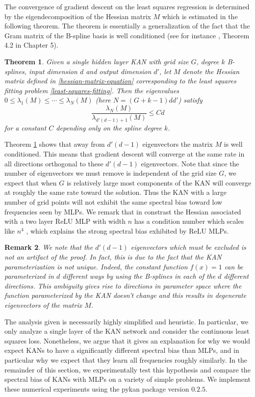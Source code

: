 \documentclass[12pt]{caltech_thesis}
\newtheorem{theorem}{Theorem}[section]
\newtheorem{remark}[theorem]{Remark}
\numberwithin{equation}{section}
\begin{document}
The convergence of gradient descent on the least squares regression is determined by the eigendecomposition of the Hessian matrix $M$ which is estimated in the following theorem. {The theorem is essentially a generalization of the fact that the Gram matrix of the B-spline basis is well conditioned (see for instance \cite{devore1993constructive}, Theorem 4.2 in Chapter 5).}
\begin{theorem}\label{hessian-eigenvalue-bound-theorem}
    Given a single hidden layer KAN with grid size $G$, degree $k$ B-splines, input dimension $d$ and output dimension $d'$, let $M$ denote the Hessian matrix defined in \eqref{hessian-matrix-equation} corresponding to the least squares fitting problem \eqref{least-squares-fitting}. Then the eigenvalues $0\leq \lambda_1(M) \leq \cdots \leq \lambda_{N}(M)$ (here $N = (G+k-1)dd'$) satisfy
    \begin{equation}
        \frac{\lambda_{N}(M)}{\lambda_{d'(d-1) + 1}(M)} \leq Cd
    \end{equation}
    for a constant $C$ depending only on the spline degree $k$.
\end{theorem}
Theorem \ref{hessian-eigenvalue-bound-theorem} shows that away from $d'(d-1)$ eigenvectors the matrix $M$ is well conditioned. This means that gradient descent will converge at the same rate in all directions orthogonal to these $d'(d-1)$ eigenvectors. Note that since the number of eigenvectors we must remove is independent of the grid size $G$, we expect that when $G$ is relatively large most components of the KAN will converge at roughly the same rate toward the solution. Thus the KAN with a large number of grid points will not exhibit the same spectral bias toward low frequencies seen by MLPs. {We remark that in constrast the Hessian associated with a two layer ReLU MLP with width $n$ has a condition number which scales like $n^4$ \cite{hong2022activation}, which explains the strong spectral bias exhibited by ReLU MLPs.}
\begin{remark}
    We note that the $d'(d-1)$ eigenvectors which must be excluded is not an artifact of the proof. In fact, this is due to the fact that the KAN parameterization is not unique. Indeed, the constant function $f(x) = 1$ can be parameterized in $d$ different ways by using the B-splines in each of the $d$ different directions. This ambiguity gives rise to directions in parameter space where the function parameterized by the KAN doesn't change and this results in degenerate eigenvectors of the matrix $M$.  
\end{remark}
The analysis given is necessarily highly simplified and heuristic. In particular, we only analyze a single layer of the KAN network and consider the continuous least squares loss. Nonetheless, we argue that it gives an explanation for why we would expect KANs to have a significantly different spectral bias than MLPs, and in particular why we expect that they learn all frequencies roughly similarly. In the remainder of this section, we experimentally test this hypothesis and compare the spectral bias of KANs with MLPs on a variety of simple problems. We implement these numerical experiments using the pykan package version $0.2.5$.
\end{document}
